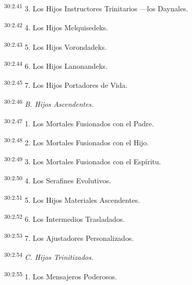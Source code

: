 \par
\textsuperscript{30:2.41} 3. Los Hijos Instructores Trinitarios ---los Daynales.

\par
\textsuperscript{30:2.42} 4. Los Hijos Melquisedeks.

\par
\textsuperscript{30:2.43} 5. Los Hijos Vorondadeks.

\par
\textsuperscript{30:2.44} 6. Los Hijos Lanonandeks.

\par
\textsuperscript{30:2.45} 7. Los Hijos Portadores de Vida.

\par
\textsuperscript{30:2.46} \textit{B. Hijos Ascendentes.}

\par
\textsuperscript{30:2.47} 1. Los Mortales Fusionados con el Padre.

\par
\textsuperscript{30:2.48} 2. Los Mortales Fusionados con el Hijo.

\par
\textsuperscript{30:2.49} 3. Los Mortales Fusionados con el Espíritu.

\par
\textsuperscript{30:2.50} 4. Los Serafines Evolutivos.

\par
\textsuperscript{30:2.51} 5. Los Hijos Materiales Ascendentes.

\par
\textsuperscript{30:2.52} 6. Los Intermedios Trasladados.

\par
\textsuperscript{30:2.53} 7. Los Ajustadores Personalizados.

\par
\textsuperscript{30:2.54} \textit{C. Hijos Trinitizados.}

\par
\textsuperscript{30:2.55} 1. Los Mensajeros Poderosos.

